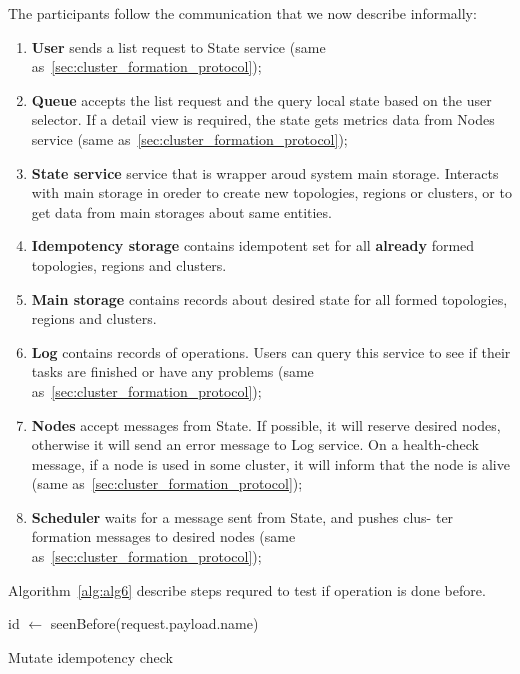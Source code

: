 The participants follow the communication that we now describe informally:
\begin{enumerate}[start=1,label={(\bfseries \arabic*)}]
	\item \textbf{User} sends a list request to State service (same as~\ref{sec:cluster_formation_protocol});
	\item \textbf{Queue} accepts the list request and the query local state based on the user selector. If a detail view is required, the state gets metrics data from Nodes service (same as~\ref{sec:cluster_formation_protocol});
	\item \textbf{State service} service that is wrapper aroud system main storage. Interacts with main storage in oreder to create new topologies, regions or clusters, or to get data from main storages about same entities.
	\item \textbf{Idempotency storage} contains idempotent set for all \textbf{already} formed topologies, regions and clusters.
	\item \textbf{Main storage} contains records about desired state for all formed topologies, regions and clusters.
	\item \textbf{Log} contains records of operations. Users can query this service to see if their tasks are finished or have any problems (same as~\ref{sec:cluster_formation_protocol});
	\item \textbf{Nodes} accept messages from State. If possible, it will reserve desired nodes, otherwise it will send an error message to Log service. On a health-check message, if a node is used in some cluster, it will inform that the node is alive (same as~\ref{sec:cluster_formation_protocol});
	\item \textbf{Scheduler} waits for a message sent from State, and pushes clus- ter formation messages to desired nodes (same as~\ref{sec:cluster_formation_protocol});
\end{enumerate}

Algorithm~\ref{alg:alg6} describe steps requred to test if operation is done before.

\begin{algorithm}[H]
	
	\SetAlgoLined
	id $\leftarrow$ seenBefore(request.payload.name)\\
	\caption{Mutate idempotency check}
	\label{alg:alg6}
\end{algorithm}

